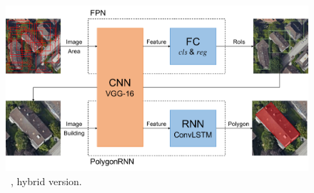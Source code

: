 \begin{figure}[!h]
	\centering
	\includegraphics[width=\fig\textwidth]{3-16.pdf}
    \caption[\modelnameshort\ , hybrid version]{\modelnameshort\ , hybrid version.}
    \label{fig:hybmod}
\end{figure}